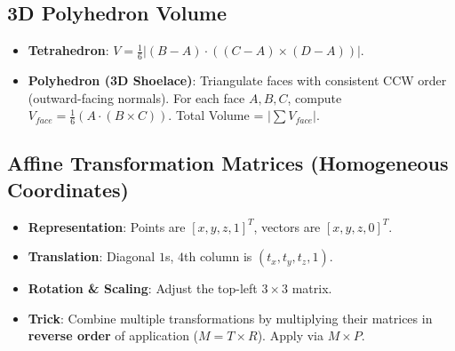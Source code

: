 \documentclass[12pt]{article}
\begin{document}
\subsection{3D Polyhedron Volume}
\begin{itemize}
    \item \textbf{Tetrahedron}: $V = \frac{1}{6} |(B-A) \cdot ((C-A) \times (D-A))|$.
    \item \textbf{Polyhedron (3D Shoelace)}: Triangulate faces with consistent CCW order (outward-facing normals). For each face $A,B,C$, compute $V_{face} = \frac{1}{6} (A \cdot (B \times C))$. Total Volume = $|\sum V_{face}|$.
\end{itemize}

\subsection{Affine Transformation Matrices (Homogeneous Coordinates)}
\begin{itemize}
    \item \textbf{Representation}: Points are $[x,y,z,1]^T$, vectors are $[x,y,z,0]^T$. 
    \item \textbf{Translation}: Diagonal $1$s, $4$th column is $(t_x, t_y, t_z, 1)$.
    \item \textbf{Rotation \& Scaling}: Adjust the top-left $3 \times 3$ matrix.
    \item \textbf{Trick}: Combine multiple transformations by multiplying their matrices in \textbf{reverse order} of application ($M = T \times R$). Apply via $M \times P$.
\end{itemize}
\end{document}
